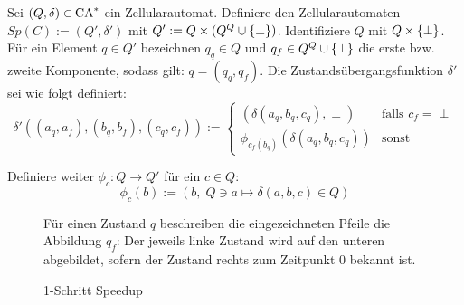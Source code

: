 \begin{definition}
    Sei $(Q, \delta) \in \textrm{CA}^*$ ein Zellularautomat.
    Definiere den Zellularautomaten $Sp(C) := (Q', \delta')$ mit $Q' := Q \times (Q^Q \cup \{ { \perp } \})$.
    Identifiziere $Q$ mit $Q \times \{ { \perp } \}$.
    Für ein Element $q \in Q'$ bezeichnen $q_q \in Q$ und $q_f \in Q^Q \cup \{ { \perp } \}$ die erste \acs{bzw.} zweite Komponente, sodass gilt: $q = (q_q, q_f)$.
    Die Zustandsübergangsfunktion $\delta'$ sei wie folgt definiert:
    \[
        \delta'((a_q, a_f), (b_q, b_f), (c_q, c_f)) :=
        \begin{cases}
            (\delta(a_q, b_q, c_q), \perp) & \text{falls } c_f = \perp \\
            \phi_{c_f(b_q)}(\delta(a_q, b_q, c_q)) & \text{sonst} 
        \end{cases}
    \]
    
    Definiere weiter $\phi_c: Q \to Q'$ für ein $c \in Q$:
    \[
        \phi_c(b) := (b, \; Q \ni a \mapsto \delta(a, b, c) \in Q)
    \]
    
    \begin{figure}[h!]
        \begin{center}
        
        \end{center}
        \caption{1-Schritt Speedup}
        
        Für einen Zustand $q$ beschreiben die eingezeichneten Pfeile die Abbildung $q_f$:
        Der jeweils linke Zustand wird auf den unteren abgebildet, sofern der Zustand rechts
        zum Zeitpunkt $0$ bekannt ist.
        \label{fig:KonstanterSpeedup}
    \end{figure}
\end{definition}

